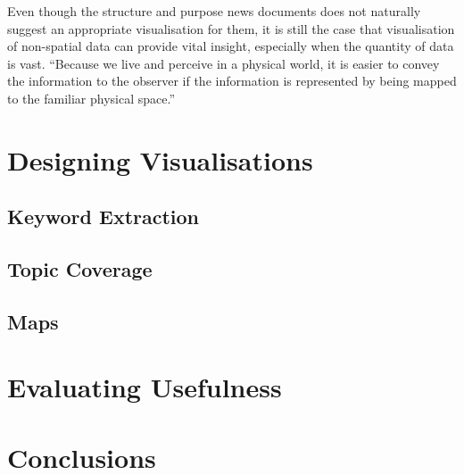 Even though the structure and purpose news documents does not naturally suggest an appropriate visualisation for them, it is still the case that visualisation of non-spatial data can provide vital insight, especially when the quantity of data is vast. ``Because we live and perceive in a physical world, it is easier to convey the information to the observer if the information is represented by being mapped to the familiar physical space.''\citep[p.39]{VisualizationsNewTack}


\section{Designing Visualisations}

\subsection{Keyword Extraction}

\subsection{Topic Coverage}

\subsection{Maps}

\section{Evaluating Usefulness}



\section{Conclusions}
